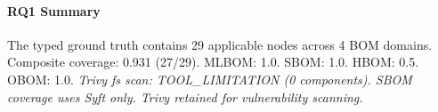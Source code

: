 \paragraph{RQ1 Summary}
The typed ground truth contains 29 applicable nodes across 4 BOM domains. 
Composite coverage: 0.931 (27/29). 
MLBOM: 1.0. 
SBOM: 1.0. 
HBOM: 0.5. 
OBOM: 1.0. 
\textit{Trivy fs scan: TOOL\_LIMITATION (0 components). SBOM coverage uses Syft only. Trivy retained for vulnerability scanning.}